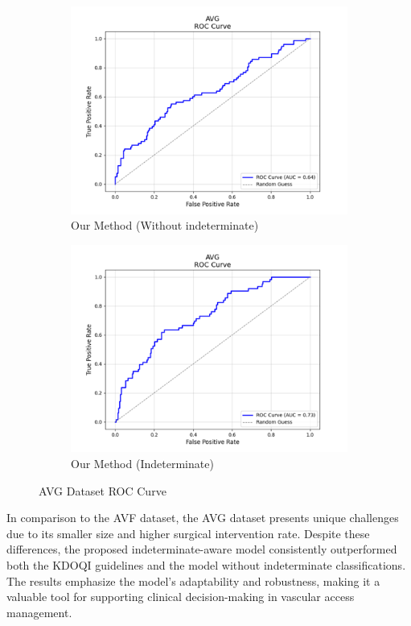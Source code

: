\begin{figure}[H]
    \begin{subfigure}[b]{0.5\textwidth}
        \centering
        \includegraphics[width=\linewidth]{figures/AVG_method1_roc.png}
        \caption{Our Method (Without indeterminate)}
        \label{fig:pta-symptom-method1-roc}
    \end{subfigure}%
    \hfill
    \begin{subfigure}[b]{0.5\textwidth}
        \centering
        \includegraphics[width=\linewidth]{figures/AVG_method2_roc.png}
        \caption{Our Method (Indeterminate)}
        \label{fig:pta-symptom-method2-roc}
    \end{subfigure}

    \caption{AVG Dataset ROC Curve}
    \label{fig:combined}
\end{figure}

In comparison to the AVF dataset, the AVG dataset presents unique challenges due to its smaller size and higher surgical intervention rate. Despite these differences, the proposed indeterminate-aware model consistently outperformed both the KDOQI guidelines and the model without indeterminate classifications. The results emphasize the model’s adaptability and robustness, making it a valuable tool for supporting clinical decision-making in vascular access management.